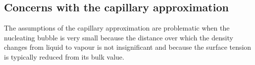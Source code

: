 



\subsection{Concerns with the capillary approximation}\label{sec:nuc:CAvalid}

The assumptions of the capillary approximation are problematic when the nucleating bubble is very small\cite{Talanquer1995}
because the distance over which the density changes from liquid to vapour is not insignificant
and because the surface tension is typically reduced from its bulk value\cite{Kiang1971}.

